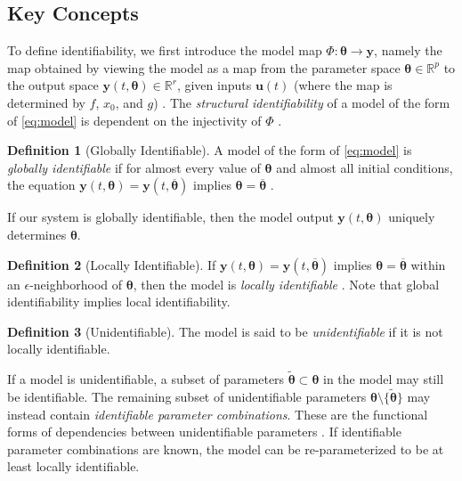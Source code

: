\documentclass[a4paper,fleqn]{cas-dc}
\theoremstyle{definition}
\newtheorem{definition}{Definition}
\begin{document}
\subsection{Key Concepts} \label{s:ident}
\noindent To define identifiability, we first introduce the model map $\Phi: \pmb{\theta} \rightarrow \pmb{y}$, namely the map obtained by viewing the model as a map from the parameter space $\pmb{\theta}\in \mathbb{R}^p$ to the output space $\pmb{y}(t, \pmb{\theta}) \in \mathbb{R}^r$, given inputs $\pmb{u}(t)$ (where the map is determined by $f$, $x_0$, and $g$) \cite{eisenberg2013input, audoly2001global}.
The \textit{structural identifiability} of a model of the form of \cref{eq:model} is dependent on the injectivity of $\Phi$ \cite{eisenberg2013identifiability, meshkat2009algorithm, saccomani2003parameter, chowell2023structural}.

\begin{definition}[Globally Identifiable]
A model of the form of \cref{eq:model} is \textit{globally identifiable} if for almost every value of $\pmb{\theta}$ and almost all initial conditions, the equation $\pmb{y}(t, \pmb{\theta}) = \pmb{y}(t, \pmb{\overline{\theta}})$ implies $\pmb{\theta} = \pmb{\overline{\theta}}$ \cite{eisenberg2013identifiability}.
\end{definition}

If our system is globally identifiable, then the model output $\pmb{y}(t,\pmb{\theta})$ uniquely determines $\pmb{\theta}$.

\begin{definition}[Locally Identifiable]
If $\pmb{y}(t, \pmb{\theta}) = \pmb{y}(t, \pmb{\overline{\theta}})$ implies $\pmb{\theta} = \pmb{\overline{\theta}}$ within an $\epsilon$-neighborhood of $\pmb{\theta}$, 
then the model is \textit{locally identifiable} \cite{evansStructuralIdentifiabilitySusceptible2005}. Note that global identifiability implies local identifiability.
\end{definition}

\begin{definition}[Unidentifiable]
The model is said to be \textit{unidentifiable} if it is not locally identifiable.
\end{definition}

If a model is unidentifiable,  a subset of parameters $\tilde{\pmb{\theta}} \subset \pmb{\theta}$ in the model may still be identifiable. 
The remaining subset of unidentifiable parameters $\pmb{\theta}\setminus \{\tilde{\pmb{\theta}} \}$ may instead contain \textit{identifiable parameter combinations}. 
These are the functional forms of dependencies between unidentifiable parameters \cite{eisenbergDeterminingIdentifiableParameter2014, bhola2023estimating}. 
If identifiable parameter combinations are known, the model can be re-parameterized to be at least locally identifiable.
\end{document}
